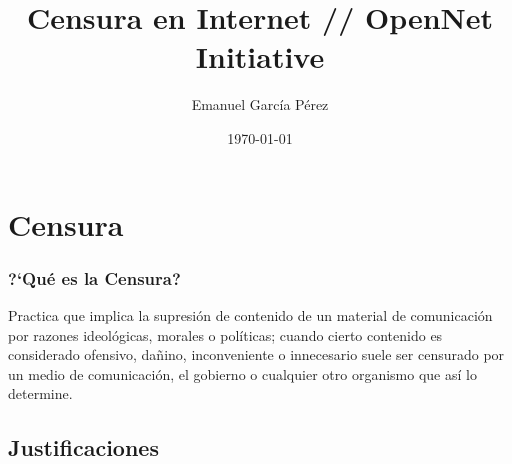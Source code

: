 \documentclass{beamer}
\title{\textbf{Censura en Internet // OpenNet Initiative}}
\author{Emanuel Garc\'ia P\'erez}
\date{\today}
\begin{document}
\frame[allowframebreaks]{\titlepage}

\section[Contenidos]{}
\frame{\tableofcontents}


\section{Censura}

\frame
{
\frametitle{?`Qu\'e es la Censura?}
Practica que implica la supresi\'on de contenido de un material de comunicaci\'on por razones ideol\'ogicas, morales o pol\'iticas; cuando cierto contenido es considerado ofensivo, da\~nino, inconveniente o innecesario suele ser censurado por un medio de comunicaci\'on, el gobierno o cualquier otro organismo que as\'i lo determine.
}

\subsection{Justificaciones}

\end{document}
